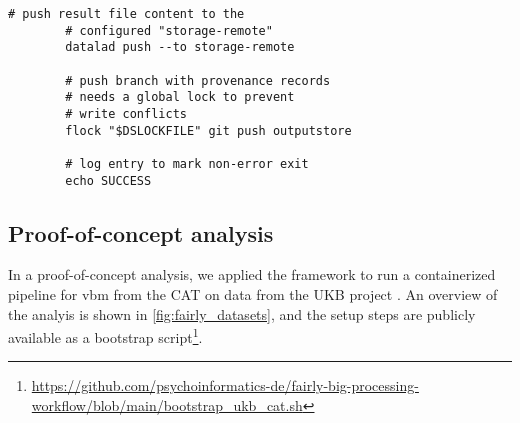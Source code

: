 \begin{Listing}
\begin{lstlisting}[multicols=2]
		# push result file content to the
		# configured "storage-remote"
		datalad push --to storage-remote

		# push branch with provenance records
		# needs a global lock to prevent
		# write conflicts
		flock "$DSLOCKFILE" git push outputstore

		# log entry to mark non-error exit
		echo SUCCESS
	\end{lstlisting}

	\caption[Job orchestration for parallel processing]{Complete compute job implementation as a bash script.
		A batch system invokes the job-script in a temporary working directory with three parameters:
		a URL of a DataLad dataset tracking all code and input data,
		a URL to deposit job-results at, and
		an identifier to select a sample for processing.
		Apart from performance-related optimizations, the job implementation conducts three main steps:
		1)~\texttt{clone} a DataLad dataset with all information to bootstrap an ephemeral computing environment for each job;
		2)~\texttt{containers-run} a containerized pipeline with a comprehensive specification of to-be-retrieved inputs and to-be-captured outputs;
		3)~\texttt{push} captured outputs and process provenance records to a permanent storage location.
		Preparation, computation, provenance record creation, and file content deposition on permanent storage are fully independent across jobs, and are executed in parallel.
		Only the \texttt{git push} of the provenance record to a central repository must be protected against concurrent write-access for technical reasons.
		Additional job parametrization (\texttt{DSLOCKFILE} and \texttt{JOBID} environment variables) are defined at job-submission using batch system specific means.
		The job script can be adjusted to a different processing pipeline by replacing the container invocation (see \texttt{APPLICATION-SPECIFIC CODE} markers).}
	\label{lst:job}
\end{Listing}


\subsection{Proof-of-concept analysis}

In a proof-of-concept analysis, we applied the framework to run a containerized pipeline for \gls{vbm} \citep{ashburner2000voxel} from the \gls{CAT} \citep{gaser} on data from the UKB project \citep[][comprising 76 TB in 43 million files under strict usage constraints]{matthews2015uk}.
An overview of the analyis is shown in \cref{fig:fairly_datasets}, and the setup steps are publicly available as a bootstrap script\footnote{\url{https://github.com/psychoinformatics-de/fairly-big-processing-workflow/blob/main/bootstrap_ukb_cat.sh}}.

